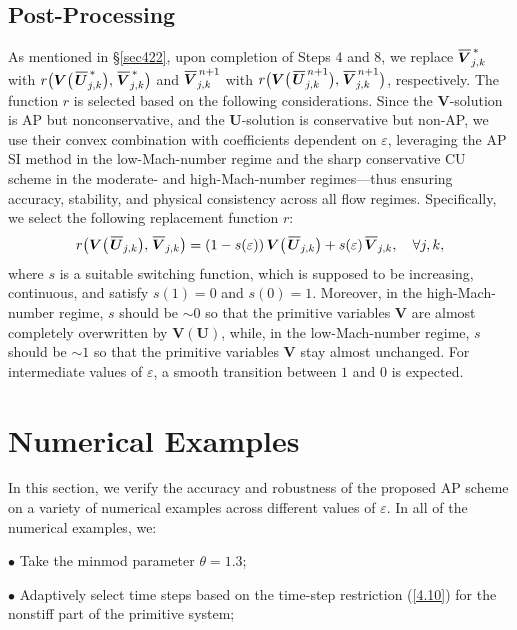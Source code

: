 \documentclass[A4paper,12pt,twoside]{article}
\numberwithin{equation}{section}
\numberwithin{figure}{section}
\numberwithin{table}{section}
\newcommand{\ve}{\varepsilon}
\newcommand\eref[1]{(\ref{#1})}
\newcommand*\xbar[1]{%
  \hbox{%
    \vbox{%
      \hrule height 0.5pt %
      \kern0.4ex%
      \hbox{%
        \kern-0.05em%
        \ensuremath{#1}%
        \kern-0.00em%
      }%
    }%
  }%
}
\begin{document}
\subsection{Post-Processing}\label{sec43}
{\color{red}As mentioned in \S\ref{sec422},} upon completion of Steps 4 and 8, we {\color{red}replace $\xbar{\bm V}^{\,*}_{j,k}$ with
$r\big(\bm V\big(\,\xbar{\bm U}^{\,*}_{j,k}\big),\,\xbar{\bm V}^{\,*}_{j,k}\big)$ and $\xbar{\bm V}^{\,n+1}_{j,k}$ with
$r\big(\bm V\big(\,\xbar{\bm U}^{\,n+1}_{j,k}\big),\,\xbar{\bm V}^{\,n+1}_{j,k}\big)$, respectively. The function $r$ is selected based on
the following considerations. Since the $\bm V$-solution is AP but nonconservative, and the $\bm U$-solution is conservative but non-AP, we
use} their convex combination with coefficients dependent on $\ve$, leveraging the AP SI method in the low-Mach-number regime and the sharp
conservative CU scheme in the moderate- and high-Mach-number regimes---thus ensuring accuracy, stability, and physical consistency across
all flow regimes. Specifically, we select the following replacement function $r$:
\begin{equation}
r\big(\bm V\big(\,\xbar{\bm U}_{j,k}\big),\,\xbar{\bm V}_{j,k}\big)=
(1-s(\ve))\,\bm V\big(\,\xbar{\bm U}_{j,k}\big)+s(\ve)\,\xbar{\bm V}_{j,k},\quad\forall j,k,
\label{star}
\end{equation}
where $s$ is a suitable switching function, which is supposed to be increasing, continuous, and satisfy $s(1)=0$ and $s(0)=1$. Moreover,
in the high-Mach-number regime, $s$ should be $\sim0$ so that the primitive variables $\bm V$ are almost completely overwritten by
$\bm V(\bm U)$, while, in the low-Mach-number regime, $s$ should be $\sim1$ so that the primitive variables $\bm V$ stay almost unchanged.
For intermediate values of $\ve$, a smooth transition between $1$ and $0$ is expected.

\section{Numerical Examples}\label{sec6}
In this section, we verify the accuracy and robustness of the proposed AP scheme on a variety of numerical examples across different values 
of $\ve$. In all of the numerical examples, we:

\smallskip
\noindent
$\bullet$ Take the minmod parameter $\theta=1.3$;

\smallskip
\noindent
$\bullet$ Adaptively select time steps based on the time-step restriction \eref{4.10} for the nonstiff part of the primitive system;
\end{document}
